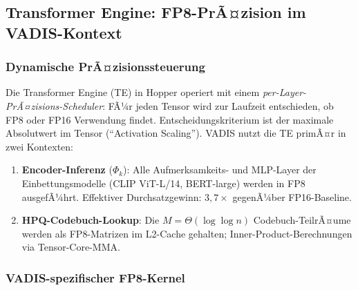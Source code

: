 ﻿\documentclass[12pt,a4paper]{article}
\begin{document}
\subsection{Transformer Engine: FP8-PrÃ¤zision im VADIS-Kontext}
\label{sub:te}

\subsubsection{Dynamische PrÃ¤zisionssteuerung}

Die Transformer Engine (TE) in Hopper operiert mit einem
\emph{per-Layer-PrÃ¤zisions-Scheduler}: FÃ¼r jeden Tensor wird
zur Laufzeit entschieden, ob FP8 oder FP16 Verwendung findet.
Entscheidungskriterium ist der maximale Absolutwert im Tensor
(``Activation Scaling''). VADIS nutzt die TE primÃ¤r in
zwei Kontexten:

\begin{enumerate}[leftmargin=1.4em, itemsep=2pt]
  \item \textbf{Encoder-Inferenz} ($\Phi_k$): Alle Aufmerksamkeits-
        und MLP-Layer der Einbettungsmodelle (CLIP ViT-L/14,
        BERT-large) werden in FP8 ausgefÃ¼hrt.
        Effektiver Durchsatzgewinn: $3{,}7\times$ gegenÃ¼ber FP16-Baseline.
  \item \textbf{HPQ-Codebuch-Lookup}: Die $M = \Theta(\log\log n)$
        Codebuch-TeilrÃ¤ume werden als FP8-Matrizen im L2-Cache
        gehalten; Inner-Product-Berechnungen via Tensor-Core-MMA.
\end{enumerate}

\subsubsection{VADIS-spezifischer FP8-Kernel}
\end{document}
